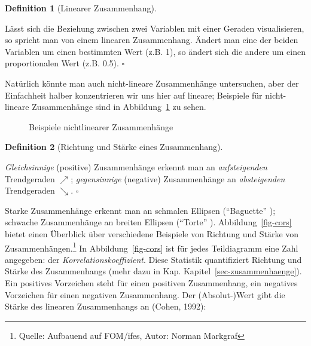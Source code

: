 \documentclass[
  letterpaper,
  twoside,
  open=any]{scrbook}
\theoremstyle{definition}
\newtheorem{definition}{Definition}[chapter]
\theoremstyle{definition}
\theoremstyle{definition}
\theoremstyle{remark}
\begin{document}
\begin{definition}[Linearer
Zusammenhang]\protect\hypertarget{def-lin-zshg}{}\label{def-lin-zshg}

Lässt sich die Beziehung zwischen zwei Variablen mit einer Geraden
visualisieren, so spricht man von einem linearen Zusammenhang. Ändert
man eine der beiden Variablen um einen bestimmten Wert (z.B. 1), so
ändert sich die andere um einen proportionalen Wert (z.B. 0.5).
\(\square\)

\end{definition}

Natürlich könnte man auch nicht-lineare Zusammenhänge untersuchen, aber
der Einfachheit halber konzentrieren wir uns hier auf lineare; Beispiele
für nicht-lineare Zusammenhänge sind in Abbildung~\ref{fig-nonlinear} zu
sehen.

\begin{figure}


\caption{\label{fig-nonlinear}Beispiele nichtlinearer Zusammenhänge}

\end{figure}%

\begin{definition}[Richtung und Stärke eines
Zusammenhang]\protect\hypertarget{def-zshg}{}\label{def-zshg}

\emph{Gleichsinnige} (positive) Zusammenhänge erkennt man an
\emph{aufsteigenden} Trendgeraden \(\nearrow\); \emph{gegensinnige}
(negative) Zusammenhänge an \emph{absteigenden} Trendgeraden
\(\searrow\). \(\square\)

\end{definition}

Starke Zusammenhänge erkennt man an schmalen Ellipsen
(\enquote{Baguette} ); schwache Zusammenhänge an breiten Ellipsen
(\enquote{Torte} ). Abbildung~\ref{fig-cors} bietet einen Überblick über
verschiedene Beispiele von Richtung und Stärke von
Zusammenhängen.\footnote{Quelle: Aufbauend auf FOM/ifes, Autor: Norman
  Markgraf} In Abbildung~\ref{fig-cors} ist für jedes Teildiagramm eine
Zahl angegeben: der \emph{Korrelationskoeffizient}. Diese Statistik
quantifiziert Richtung und Stärke des Zusammenhangs (mehr dazu in Kap.
Kapitel~\ref{sec-zusammenhaenge}). Ein positives Vorzeichen steht für
einen positiven Zusammenhang, ein negatives Vorzeichen für einen
negativen Zusammenhang. Der (Absolut-)Wert gibt die Stärke des linearen
Zusammenhangs an (Cohen, 1992):
\end{document}
